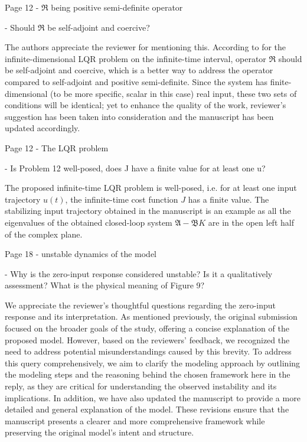 \documentclass[11pt,answers]{exam}
\begin{document}
\begin{questions}
    \question Page 12 - $\mathfrak{R}$ being positive semi-definite operator

    - Should $\mathfrak{R}$ be self-adjoint and coercive?

    \begin{solutionorbox} \label{comment:1_9}
        The authors appreciate the reviewer for mentioning this. According to \cite{curtainbook} for the infinite-dimensional LQR problem on the infinite-time interval, operator $\mathfrak{R}$ should be self-adjoint and coercive, which is a better way to address the operator compared to self-adjoint and positive semi-definite. Since the system has finite-dimensional (to be more specific, scalar in this case) real input, these two sets of conditions will be identical; yet to enhance the quality of the work, reviewer's suggestion has been taken into consideration and the manuscript has been updated accordingly.
    \end{solutionorbox}


    \question Page 12 - The LQR problem

    - Is Problem 12 well-posed, does J have a finite value for at least one u?

    \begin{solutionorbox} \label{comment:1_10}
        The proposed infinite-time LQR problem is well-posed, i.e. for at least one input trajectory $u(t)$, the infinite-time cost function $J$ has a finite value. The stabilizing input trajectory obtained in the manuscript is an example as all the eigenvalues of the obtained closed-loop system $\mathfrak{A} - \mathfrak{B} K$ are in the open left half of the complex plane. 
    \end{solutionorbox}


    \question Page 18 - unstable dynamics of the model

    - Why is the zero-input response considered unstable? Is it a qualitatively assessment? What is the physical meaning of Figure 9?

    \begin{solutionorbox} \label{comment:1_11}
        We appreciate the reviewer’s thoughtful questions regarding the zero-input response and its interpretation. As mentioned previously, the original submission focused on the broader goals of the study, offering a concise explanation of the proposed model. However, based on the reviewers’ feedback, we recognized the need to address potential misunderstandings caused by this brevity. To address this query comprehensively, we aim to clarify the modeling approach by outlining the modeling steps and the reasoning behind the chosen framework here in the reply, as they are critical for understanding the observed instability and its implications. In addition, we have also updated the manuscript to provide a more detailed and general explanation of the model. These revisions ensure that the manuscript presents a clearer and more comprehensive framework while preserving the original model’s intent and structure.
        

\end{solutionorbox}
\end{questions}
\end{document}
